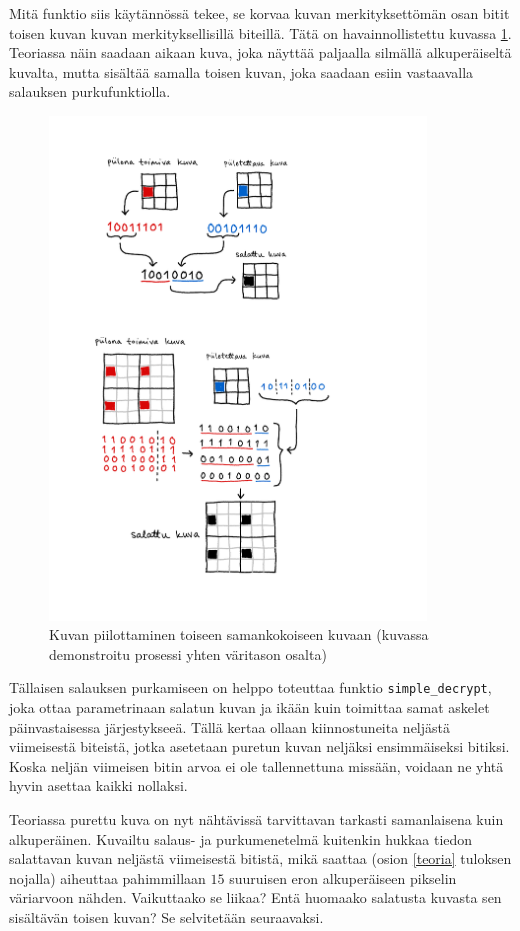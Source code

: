 \documentclass[a4paper,11pt]{article}
\begin{document}
Mitä funktio siis käytännössä tekee, se korvaa kuvan merkityksettömän osan bitit toisen kuvan kuvan merkityksellisillä biteillä. Tätä on havainnollistettu kuvassa \ref{metodi1}. Teoriassa näin saadaan aikaan kuva, joka näyttää paljaalla silmällä alkuperäiseltä kuvalta, mutta sisältää samalla toisen kuvan, joka saadaan esiin vastaavalla salauksen purkufunktiolla.

\begin{figure}
    \centering
    \includegraphics[width= 100mm]{kuvat/steganografia-esim1.pdf}
    \caption{Kuvan piilottaminen toiseen samankokoiseen kuvaan (kuvassa demonstroitu prosessi yhten väritason osalta)}
    \label{metodi1}
\end{figure}

Tällaisen salauksen purkamiseen on helppo toteuttaa funktio \texttt{simple\_decrypt}, joka ottaa parametrinaan salatun kuvan ja ikään kuin toimittaa samat askelet päinvastaisessa järjestykseeä. Tällä kertaa ollaan kiinnostuneita neljästä viimeisestä biteistä, jotka asetetaan puretun kuvan neljäksi ensimmäiseksi bitiksi. Koska neljän viimeisen bitin arvoa ei ole tallennettuna missään, voidaan ne yhtä hyvin asettaa kaikki nollaksi.

Teoriassa purettu kuva on nyt nähtävissä tarvittavan tarkasti samanlaisena kuin alkuperäinen. Kuvailtu salaus- ja purkumenetelmä kuitenkin hukkaa tiedon salattavan kuvan neljästä viimeisestä bitistä, mikä saattaa (osion \ref{teoria} tuloksen nojalla) aiheuttaa pahimmillaan $15$ suuruisen eron alkuperäiseen pikselin väriarvoon nähden. Vaikuttaako se liikaa? Entä huomaako salatusta kuvasta sen sisältävän toisen kuvan? Se selvitetään seuraavaksi.
\end{document}

